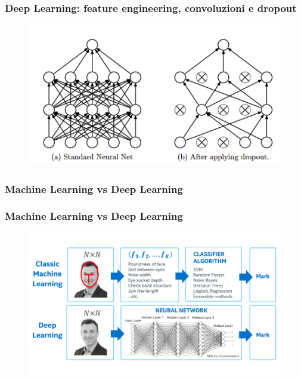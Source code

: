 \begin{frame}

	\frametitle{Deep Learning: feature engineering, convoluzioni e dropout}

	\begin{figure}[!htbp]
		\centering
		\includegraphics[width=0.9\linewidth]{images/supervised/z_algorithms_deep_learning/dropout.png}
	\end{figure}

\end{frame}


\subsubsection[Machine Learning vs Deep Learning]{Machine Learning vs Deep Learning}
\begin{frame}

	\frametitle{Machine Learning vs Deep Learning}

	\begin{figure}[!htbp]
		\centering
		\includegraphics[width=1.0\linewidth]{images/supervised/z_algorithms_deep_learning/machine-vs-deep-learning-facial-recognition.png}
	\end{figure}

\end{frame}


